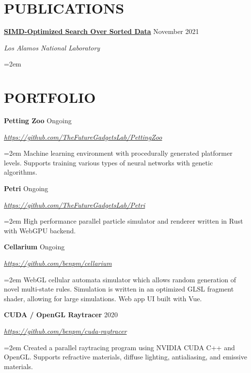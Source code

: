 \documentclass[paper=a4,fontsize=11pt]{scrartcl} %
\newcommand{\sepspace}{\vspace*{1em}}		%
\newcommand{\sym}{\raisebox{1pt}{$\blacktriangleright$}}
\newcommand{\showurl}[1]{\href{#1}{#1}}
\newcommand{\NewPart}[1]{\section*{\sym \mbox{} \MakeUppercase{#1}}}
\newcommand{\EducationEntry}[5]{
		\Large \noindent \textbf{#1} \hfill \\   %
		\normalsize \noindent \textit{#2} \hfill	  %
		\colorbox{yel}{\color{blk}#3} \par  %
		\noindent \textit{#4} \par        %
		\noindent\hangindent=2em\hangafter=0 \small #5 %
		\normalsize \par
		\sepspace}
\newcommand{\WorkEntry}[4]{				  %
		\noindent \textbf{#1} \hfill      %
		\colorbox{yel}{\color{blk}#2} \par  %
		\noindent \textit{#3} \par              %
		\noindent\hangindent=2em\hangafter=0 \small #4 %
		\normalsize \par
		\sepspace}
\begin{document}



\NewPart{Publications}{}

\WorkEntry{\href{https://asmedigitalcollection.asme.org/computingengineering/article-abstract/22/2/021009/1121736/simd-Optimized-Search-Over-Sorted-Data}{SIMD-Optimized Search Over Sorted Data}}
	{November 2021}{Los Alamos National Laboratory}



\pagebreak

\NewPart{Portfolio}{}

\WorkEntry{Petting Zoo}{Ongoing}{\showurl{https://github.com/TheFutureGadgetsLab/PettingZoo}}{
	Machine learning environment with procedurally generated platformer levels.
	Supports training various types of neural networks with genetic algorithms.
}

\WorkEntry{Petri}{Ongoing}{\showurl{https://github.com/TheFutureGadgetsLab/Petri}}{
	High performance parallel particle simulator and renderer written in Rust with WebGPU backend.
}

\WorkEntry{Cellarium}{Ongoing}{\showurl{https://github.com/benpm/cellarium}}{
	WebGL cellular automata simulator which allows random generation of novel multi-state rules.
	Simulation is written in an optimized GLSL fragment shader, allowing for large simulations.
	Web app UI built with Vue.
}

\WorkEntry{CUDA / OpenGL Raytracer}{2020}{\showurl{https://github.com/benpm/cuda-raytracer}}{
	Created a parallel raytracing program using NVIDIA CUDA C++ and OpenGL.
	Supports refractive materials, diffuse lighting, antialiasing, and emissive materials.
}
\end{document}
